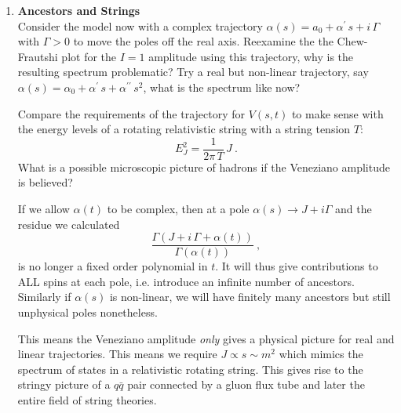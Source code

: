 \begin{enumerate}
    \item \textbf{Ancestors and Strings}\\
          Consider the model now with a complex trajectory $\alpha(s) = a_0 + \alpha^\prime \, s + i \,\Gamma$ with $\Gamma > 0$ to move the poles off the real axis. Reexamine the the Chew-Frautshi plot for the $I=1$ amplitude using this trajectory, why is the resulting spectrum problematic? Try a real but non-linear trajectory, say $\alpha(s) = \alpha_0 + \alpha^\prime \, s + \alpha^{\prime\prime} \, s^2$, what is the spectrum like now?

          Compare the requirements of the trajectory for $V(s,t)$ to make sense with the energy levels of a rotating relativistic string with a string tension $T$:
          \begin{equation}
              E_J^2 = \frac{1}{2\pi \, T} \, J ~.
          \end{equation}
          What is a possible microscopic picture of hadrons if the Veneziano amplitude is believed?

          \begin{solution}
              If we allow $\alpha(t)$ to be complex, then at a pole $\alpha(s) \to J + i \Gamma$ and the residue we calculated
              \begin{equation}
                  \frac{\Gamma(J+i \,\Gamma + \alpha(t))}{\Gamma(\alpha(t))} ~,
              \end{equation}
              is no longer a fixed order polynomial in $t$. It will thus give contributions to ALL spins at each pole, i.e. introduce an infinite number of ancestors. Similarly if $\alpha(s)$ is non-linear, we will have finitely many ancestors but still unphysical poles nonetheless.

              This means the Veneziano amplitude \textit{only} gives a physical picture for real and linear trajectories. This means we require $J \propto s \sim m^2$ which mimics the spectrum of states in a relativistic rotating string. This gives rise to the stringy picture of a $q\bar{q}$ pair connected by a gluon flux tube and later the entire field of string theories.
          \end{solution}

\end{enumerate}
